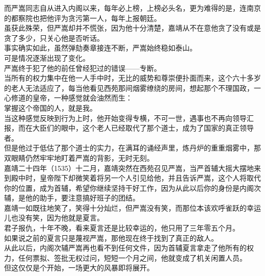 \begin{multicols}{\theparacolNo}
而严嵩同志自从进入内阁以来，每年必上榜，上榜必头名，更为难得的是，连南京的都察院也把他评为贪污第一人，每年上报朝廷。\\

虽获此殊荣，但严嵩却并不慌张，因为他十分清楚，嘉靖从不在意他贪了没有或是贪了多少，只关心他是否听话。\\

事实确实如此，虽然弹劾奏章接连不断，严嵩始终稳如泰山。\\

可是情况逐渐出现了变化。\\

严嵩终于犯了他的前任曾经犯过的错误——专断。\\

当所有的权力集中在他一人手中时，无比的威势和尊崇便扑面而来，这个六十多岁的老人无法适应了，每当他看见西苑那间烟雾缭绕的房间，想起那个不理国政，一心修道的皇帝，一种感觉就会油然而生：\\

掌握这个帝国的人，就是我。\\

当这种感觉反映到行为上时，他开始变得专横，不可一世，遇事也不再向领导汇报，而在大臣们的眼中，这个老人已经取代了那个道士，成为了国家的真正领导者。\\

但是他过于低估了那个道士的实力，在满耳的诵经声里，炼丹炉的重重烟雾中，那双眼睛仍然牢牢地盯着严嵩的背影，无时无刻。\\

嘉靖二十四年（1535）十二月，嘉靖突然在西苑召见严嵩，当严首辅大摇大摆地来到殿中时，皇帝陛下却微笑着将另一个人引见给他，并且告诉严嵩，这个人将取代你的位置，成为首辅，希望你继续坚持干好工作，因为从此以后你的身份是内阁次辅，是他的助手，要注意搞好班子的团结。\\

嘉靖一如既往地笑了，笑得十分灿烂，但严嵩没有笑，而那位本该欢呼雀跃的幸运儿也没有笑，因为他就是夏言。\\

君子报仇，十年不晚，看来夏言还是比较幸运的，他只用了三年零五个月。\\

如果说之前的夏言只是蔑视严嵩，那他现在终于找到了真正的敌人。\\

从此以后，内阁次辅严嵩再也看不到任何文件，因为首辅夏言拿走了他所有的权力，任何票拟、签批无权过问，短短一个月之间，他就变成了机关闲置人员。\\

但这仅仅是个开始，一场更大的风暴即将展开。\\


\end{multicols}
